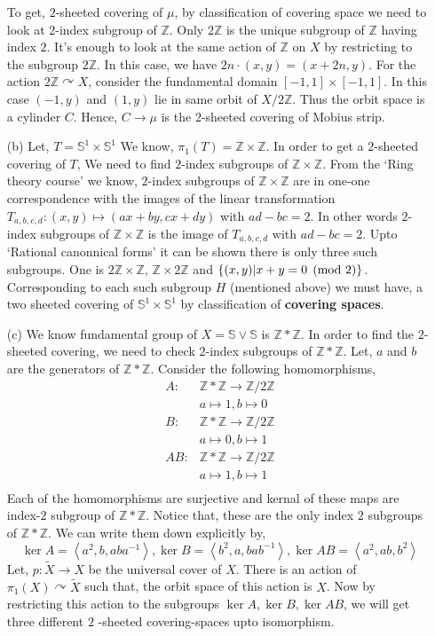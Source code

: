 \documentclass[11pt]{article}
\newcommand{\bb}[1]{\mathbb{#1}}
\newcommand{\Z}{\bb{Z}}
\newcommand{\inp}[2]{\left\langle {#1}, {#2} \right\rangle}
\newcommand{\s}{\bb{S}}
\begin{document}
\begin{itemize}
    \vspace*{0.2cm}

    \noindent To get, $2$-sheeted covering of $\mu$, by classification of covering space we need to look at $2$-index subgroup of $\Z$. Only $2\Z$ is the unique subgroup of $\Z$ having index $2$. It's enough to look at the same action of $\Z$ on $X$ by restricting to the subgroup $2\Z$. In this case, we have $2n \cdot (x,y) = (x+2n,y)$. For the action $2\Z \curvearrowright X$, consider the fundamental domain $[-1,1]\times [-1,1]$. In this case $(-1,y)$ and $(1,y)$ lie in same orbit of $X/2\Z$. Thus the orbit space is a cylinder $C$. Hence, $C \to \mu$ is the $2$-sheeted covering of Mobius strip. 
    
    \item[(b)] Let, $T = \s^1 \times \s^1$ We know, $\pi_1(T)=\Z \times \Z$. In order to get a $2$-sheeted covering of $T$, We need to find $2$-index subgroups of $\Z \times \Z$. From the `Ring theory course' we know, $2$-index subgroups of $\Z \times \Z$ are in one-one correspondence with the images of the linear transformation $T_{a,b,c,d} : (x,y) \mapsto (ax+by,cx+dy)$ with $ad -bc =2$. In other words $2$-index subgroups of $\Z \times \Z$ is the image of $T_{a,b,c,d}$ with $ad-bc=2$. Upto `Rational canonnical forms' it can be shown there is only three such subgroups. One is $2\Z \times \Z$, $\Z \times 2\Z$ and $\qty{(x,y)| x+y = 0 \pmod{2}}$. Corresponding to each such subgroup $H$ (mentioned above) we must have, a two sheeted covering of $\s^1 \times \s^1$ by classification of \textbf{\textsf{covering spaces}}. 
    

    \item[(c)] We know fundamental group of $X=\s \vee \s$ is $\Z \ast \Z$. In order to find the $2$-sheeted covering, we need to check $2$-index subgroups of $\Z \ast \Z$. Let, $a$ and $b$ are the generators of $\Z \ast \Z$.  Consider the following homomorphisms, \begin{align*}
        A:& \Z \ast \Z \to \Z/2\Z \\
          & a \mapsto 1, b \mapsto 0 \\
        B:&  \Z \ast \Z \to \Z/2\Z\\
          &  a \mapsto 0, b \mapsto 1 \\
        AB:&  \Z \ast \Z \to \Z/2\Z\\
           &   a \mapsto 1, b \mapsto 1 \\
    \end{align*}  
    Each of the homomorphisms are surjective and kernal of these maps are index-$2$ subgroup of $\Z \ast \Z$. Notice that, these are the only index $2$ subgroups of $\Z \ast \Z$. We can write them down explicitly by, $$\ker A = \inp{a^2}{b,aba^{-1}}, \ker B = \inp{b^2}{a,bab^{-1}}, \ker AB = \inp{a^2}{ab,b^2}$$
    Let, $p:\tilde{X} \to X$ be the universal cover of $X$. There is an action of $\pi_1(X) \curvearrowright \tilde{X}$ such that, the orbit space of this action is $X$. Now by restricting this action to the subgroups $\ker A,\ker B,\ker AB$, we will get three different $2$ -sheeted covering-spaces upto isomorphism. 

\end{itemize}
\end{document}
